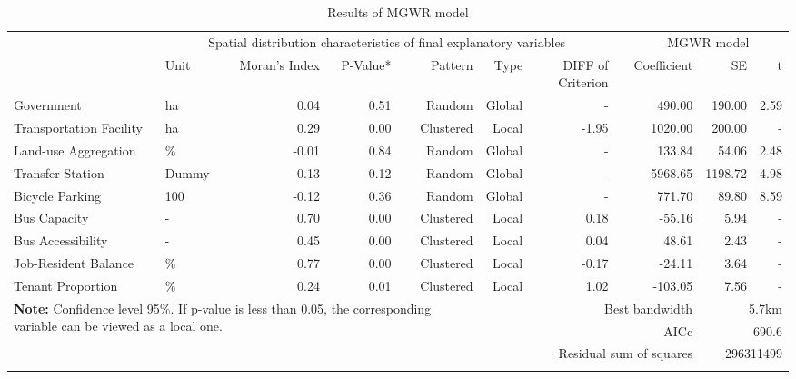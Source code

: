 \begin{sidewaystable}[htbp]
	\centering
	\caption{Results of MGWR model}
	\label{tab:chp4:ResultMGWR}
	\small
	\renewcommand{\arraystretch}{1.25} %
	
	\begin{tabular}{llrrrrrrrrr}
		\Xhline{1.5pt}
		\multicolumn{1}{l}{\multirow{2}[4]{*}{Variable}} & \multicolumn{6}{c}{Spatial distribution characteristics of final explanatory variables} & & \multicolumn{3}{c}{MGWR model} \\
		
		\cmidrule{2-7}\cmidrule{9-11}
		
		& \multicolumn{1}{p{3em}}{Unit} & \multicolumn{1}{p{4em}}{Moran's Index} & P-Value* & Pattern & Type & \multicolumn{1}{p{4em}}{DIFF of Criterion} & & Coefficient & SE & t \\
		
		\cmidrule{1-7}\cmidrule{9-11}
		
		Government & ha & 0.04 & 0.51 & Random & Global &- & & 490.00 & 190.00 & 2.59 \\
		Transportation Facility & ha & 0.29 & 0.00 & Clustered & Local & -1.95 & & 1020.00 & 200.00 & - \\
		Land-use Aggregation & \% & -0.01 & 0.84 & Random & Global & - & & 133.84 & 54.06 & 2.48 \\
		Transfer Station & Dummy & 0.13 & 0.12 & Random & Global & - & & 5968.65 & 1198.72 & 4.98 \\
		Bicycle Parking & 100 & -0.12 & 0.36 & Random & Global & - & & 771.70 & 89.80 & 8.59 \\
		Bus Capacity & - & 0.70 & 0.00 & Clustered & Local & 0.18  & & -55.16 & 5.94  & - \\
		Bus Accessibility & - & 0.45 & 0.00 &  Clustered & Local & 0.04 & & 48.61 & 2.43 & - \\
		Job-Resident Balance & \% & 0.77 & 0.00 & Clustered & Local & -0.17 & & -24.11 & 3.64 & - \\
		Tenant Proportion & \% & 0.24 & 0.01 & Clustered & Local & 1.02 & & -103.05 & 7.56 & - \\
		
		\midrule
		
		\multicolumn{5}{l}{\multirow{3}[2]{30em}{\textbf{Note:} Confidence level 95\%. If p-value is less than 0.05, the corresponding variable can be viewed as a local one.}} & \multicolumn{4}{r}{Best bandwidth} & \multicolumn{2}{r}{5.7km} \\
		\multicolumn{5}{l}{} & \multicolumn{4}{r}{AICc} & \multicolumn{2}{r}{690.6} \\
		\multicolumn{5}{l}{} & \multicolumn{4}{r}{Residual sum of squares} & \multicolumn{2}{r}{296311499} \\
		
		\Xhline{1.5pt}
	\end{tabular}%
\end{sidewaystable}%


